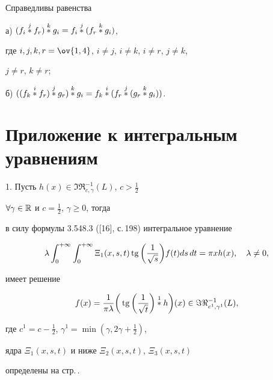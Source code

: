  


\begin{cor} 


Справедливы равенства 


 


а) $(f_i\overset{j}{*}{}f_r)\overset{k}{*}{}g_i=f_i\overset{j}{*}{}(f_r\overset{k}{*}{}g_i)$, 


где $i,j,k,r=\ov{1,4}$, $i\ne j$, $i\ne k$, $i\ne r$, $j\ne k$, 


$j\ne r$, $k\ne r$; 


 


б) $((f_k\up{i}{*}f_r)\up{j}{*}g_r)\up{k}{*}g_i= 


f_k\up{i}{*}(f_r\up{j}{*}(g_r\up{k}{*}g_i))$. 


\end{cor} 


 


\section{Приложение к интегральным уравнениям} 


 


1. Пусть $h(x)\in\Im\Re^{-1}_{c,\gamma}(L)$, $c>\frac{1}{2}$ 


$\forall\gamma\in\Bbb R$ и $c=\frac{1}{2}$, $\gamma\ge0$, тогда 


в силу формулы 3.548.3 ([16], с.\,198) интегральное уравнение 


$$ 


\lambda\int^{+\infty}_0\int^{+\infty}_0 


\Xi_1(x,s,t)\tg\bigg(\frac{1}{\sqrt{s}} \bigg)f(t)ds\,dt= 


\pi x h (x),\quad \lambda\ne 0, 


$$ 


имеет решение 


$$ 


f(x)=\frac{1}{\pi\lambda}\bigg(\tg\bigg(\frac{1}{\sqrt{t}}\bigg) 


\up{1}{*}h\bigg)(x)\in\Im\Re^{-1}_{c^1,\gamma^1}(L), 


$$ 


где $c^1=c-\frac{1}{2}$, $\gamma^1=\min(\gamma,2\gamma+\frac{1}{2})$, 


ядра $\Xi_1(x,s,t)$ и ниже $\Xi_2(x,s,t)$, $\Xi_3(x,s,t)$ 


определены на стр.\,\pageref{kernels}. 


